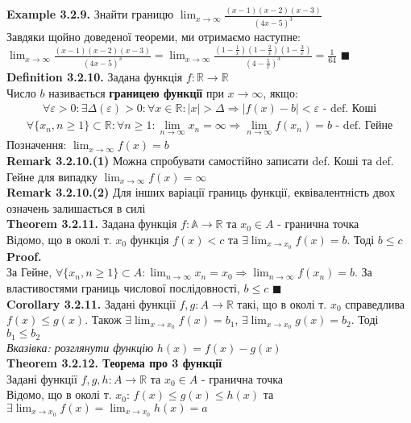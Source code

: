 \documentclass[a4paper, 14pt]{extarticle}
\def\huge{\displaystyle}
\def\bigline{\vspace{5mm}\\}
\def\defin#1{\textbf{Definition {#1}}}
\def\ex#1{\textbf{Example {#1}}}
\def\rm#1{\textbf{Remark {#1}}}
\def\th#1{\textbf{Theorem {#1}}}
\def\crl#1{\textbf{Corollary {#1}}}
\def\proof{\textbf{Proof.}\\}
\def\bigline{\vspace{5mm}\\}
\def\qed{$\blacksquare$}
\begin{document}
	\ex{3.2.9.} Знайти границю $\huge \lim_{x \to \infty} \frac{(x-1)(x-2)(x-3)}{(4x-5)^3}$\\
	Завдяки щойно доведеної теореми, ми отримаємо наступне:\\
	$\huge \lim_{x \to \infty} \frac{(x-1)(x-2)(x-3)}{(4x-5)^3} = \lim_{x \to \infty} \frac{(1-\frac{1}{x})(1-\frac{2}{x})(1-\frac{3}{x})}{(4-\frac{5}{x})^3} = \frac{1}{64}$ \qed
	\bigline
	
	\defin{3.2.10.} Задана функція $f: \mathbb{R} \to \mathbb{R}$ \\
	Число $b$ називається \textbf{границею функції} при $x \to \infty$, якщо:
	\begin{align*}
	\forall \varepsilon > 0: \exists \Delta(\varepsilon) > 0: \forall x \in \mathbb{R}: |x|>\Delta \Rightarrow |f(x)-b|<\varepsilon \textrm{ - def. Коші}
	\end{align*}
	\begin{align*}
	\forall \{x_n, n \geq 1\} \subset \mathbb{R}: \forall n \geq 1: \lim_{n \to \infty} x_n = \infty \Rightarrow \lim_{n \to \infty} f(x_n) = b \textrm{ - def. Гейне}
	\end{align*}
	Позначення: $\huge \lim_{x \to \infty} f(x) = b$ \bigline
	\rm{3.2.10.(1)} Можна спробувати самостійно записати def. Коші та def. Гейне для випадку $\huge \lim_{x \to \infty} f(x) = \infty$\\
	\rm{3.2.10.(2)} Для інших варіації границь функції, еквівалентність двох означень залишається в силі
	\bigline
	\th{3.2.11.} Задана функція $f: \mathbb{A} \to \mathbb{R}$ та $x_0 \in A$ - гранична точка\\
Відомо, що в околі т. $x_0$ функція $f(x) < c$ та $\exists \huge \lim_{x \to x_0} f(x) = b$. Тоді $b \leq c$\\
\proof
За Гейне, $\huge \forall \{x_n, n \geq 1\} \subset A:  \lim_{n \to \infty} x_n = x_0 \Rightarrow \lim_{n \to \infty} f(x_n) = b$. За властивостями границь числової послідовності, $b \leq c$ \qed
\bigline
\crl{3.2.11.} Задані функції $f,g: A \to \mathbb{R}$ такі, що в околі т. $x_0$ справедлива $f(x) \leq g(x)$. Також $\exists \huge \lim_{x \to x_0} f(x) = b_1$, $\exists \huge \lim_{x \to x_0} g(x) = b_2$. Тоді $b_1 \leq b_2$\\
\textit{Вказівка: розглянути функцію} $h(x) = f(x) - g(x)$
\bigline
\th{3.2.12. Теорема про 3 функції}\\
Задані функції $f,g,h: A \to \mathbb{R}$ та $x_0 \in A$ - гранична точка\\
Відомо, що в околі т. $x_0$: $f(x) \leq g(x) \leq h(x)$ та \\ $\exists \huge \lim_{x \to x_0} f(x) = \lim_{x \to x_0} h(x) = a$\\
\end{document}
